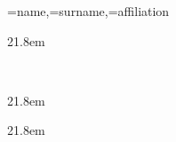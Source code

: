 \documentclass{article}
\begin{document}
{\name=name,\surname=surname,\affiliation=affiliation}
 {
    \BgThispage
    \topskip21.8em
    \begin{center}
    \calligra
    {\fontsize{50}{60}\selectfont \name~\surname}
    \end{center}
    \vspace*{\fill}
    \newpage
 }
\newpage
 \BgThispage
\topskip21.8em
\begin{center}
\calligra
\end{center}
\vspace*{\fill}
\newpage
 \BgThispage
\topskip21.8em
\begin{center}
\calligra
\end{center}
\vspace*{\fill}
\end{document}
